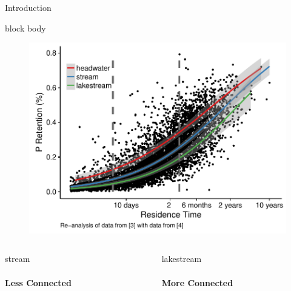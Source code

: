 \documentclass[final,hyperref={pdfpagelabels=false}]{beamer}
\begin{document}
\begin{frame}[t]
\begin{columns}[t]
\begin{column}{.465\textwidth}
\begin{block}{Introduction}
\vspace{1em}
{
\begin{beamercolorbox}[wd=\textwidth,rounded=true]{block body}
   \begin{figure}
      \includegraphics[width=\linewidth]{milstead_multi.pdf}
   \end{figure}

\vspace{1.4em}

\begin{columns}


\begin{column}{0.5\textwidth}
\centering
\large stream \\
\vspace{0.5em}
 \\
\textbf{Less Connected}
\end{column}

\begin{column}{0.5\textwidth}
\centering
\large lakestream \\
\vspace{0.5em}
 \\
\textbf{More Connected}
\end{column}
\end{columns}
\vspace{0.3em}
\end{beamercolorbox}
}



\end{block}
\end{column}
\end{columns}
\end{frame}
\end{document}
